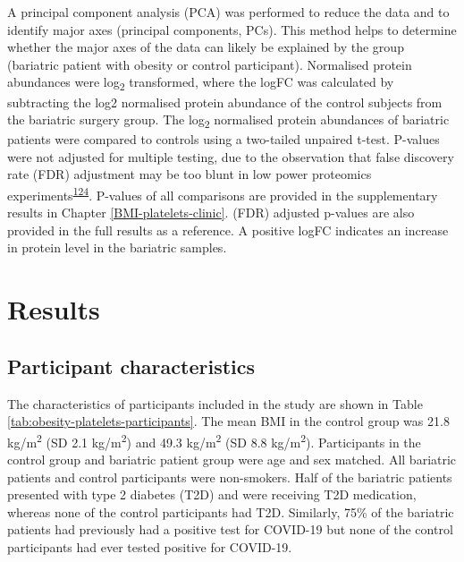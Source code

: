 \documentclass[11pt,twoside]{bristolthesis}
\begin{document}
A principal component analysis (PCA) was performed to reduce the data and to identify major axes (principal components, PCs). This method helps to determine whether the major axes of the data can likely be explained by the group (bariatric patient with obesity or control participant). Normalised protein abundances were log\textsubscript{2} transformed, where the logFC was calculated by subtracting the log2 normalised protein abundance of the control subjects from the bariatric surgery group. The log\textsubscript{2} normalised protein abundances of bariatric patients were compared to controls using a two-tailed unpaired t-test. P-values were not adjusted for multiple testing, due to the observation that false discovery rate (FDR) adjustment may be too blunt in low power proteomics experiments\textsuperscript{\protect\hyperlink{ref-Pascovici2016}{124}}. P-values of all comparisons are provided in the supplementary results in Chapter \ref{BMI-platelets-clinic}. (FDR) adjusted p-values are also provided in the full results as a reference. A positive logFC indicates an increase in protein level in the bariatric samples.

\hypertarget{results-1}{%
\section{Results}\label{results-1}}

\hypertarget{participant-characteristics}{%
\subsection{Participant characteristics}\label{participant-characteristics}}

The characteristics of participants included in the study are shown in Table \ref{tab:obesity-platelets-participants}. The mean BMI in the control group was 21.8 kg/m\textsuperscript{2} (SD 2.1 kg/m\textsuperscript{2}) and 49.3 kg/m\textsuperscript{2} (SD 8.8 kg/m\textsuperscript{2}). Participants in the control group and bariatric patient group were age and sex matched. All bariatric patients and control participants were non-smokers. Half of the bariatric patients presented with type 2 diabetes (T2D) and were receiving T2D medication, whereas none of the control participants had T2D. Similarly, 75\% of the bariatric patients had previously had a positive test for COVID-19 but none of the control participants had ever tested positive for COVID-19.
\end{document}
